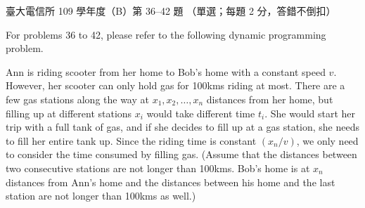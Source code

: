 \begin{pastexam}[label={px:ntu-109-comm-dsa-36}]{臺大電信所 109 學年度（B）第 36--42 題}
（單選；每題 2 分，答錯不倒扣）

For problems 36 to 42, please refer to the following dynamic programming problem.

\begin{center}
\end{center}

Ann is riding scooter from her home to Bob's home with a constant speed $v$. However, her scooter
can only hold gas for 100kms riding at most. There are a few gas stations along the way at
$x_1,x_2,\ldots,x_n$ distances from her home, but filling up at different stations $x_i$ would take
different time $t_i$. She would start her trip with a full tank of gas, and if she decides to fill
up at a gas station, she needs to fill her entire tank up. Since the riding time is constant
$(x_n/v)$, we only need to consider the time consumed by filling gas. (Assume that the distances
between two consecutive stations are not longer than 100kms. Bob's home is at $x_n$ distances from
Ann's home and the distances between his home and the last station are not longer than 100kms as
well.)


\end{pastexam}

